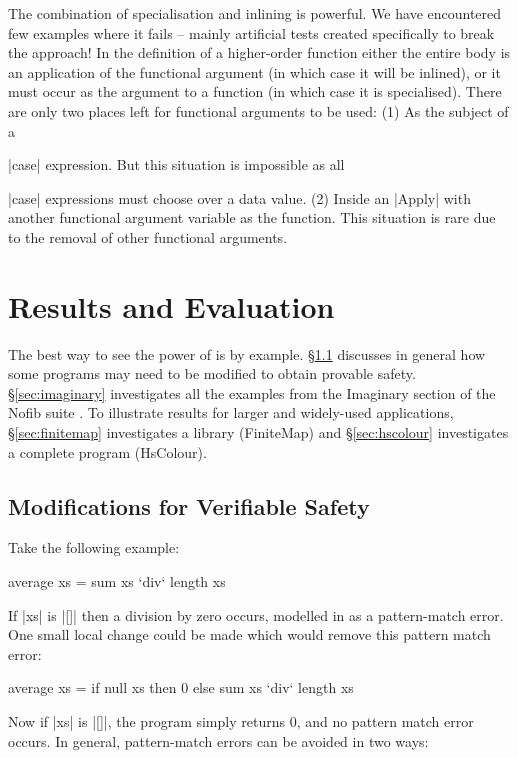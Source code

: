 The combination of specialisation and inlining is powerful. We have encountered few examples where it fails -- mainly artificial tests created specifically to break the approach! In the definition of a higher-order function either the entire body is an application of the functional argument (in which case it will be inlined), or it must occur as the argument to a function (in which case it is specialised). There are only two places left for functional arguments to be used: (1) As the subject of a \ignore|case| expression. But this situation is impossible as all \ignore|case| expressions must choose over a data value. (2) Inside an |Apply| with another functional argument variable as the function. This situation is rare due to the removal of other functional arguments.

\section{Results and Evaluation}
\label{sec:results}

The best way to see the power of \catch{} is by example. \S\ref{sec:safety} discusses in general how some programs may need to be modified to obtain provable safety. \S\ref{sec:imaginary} investigates all the examples from the Imaginary section of the Nofib suite \cite{nofib}. To illustrate results for larger and widely-used applications, \S\ref{sec:finitemap} investigates a library (FiniteMap) and \S\ref{sec:hscolour} investigates a complete program (HsColour).


\subsection{Modifications for Verifiable Safety}
\label{sec:safety}

Take the following example:

\begin{code}
average xs = sum xs `div` length xs
\end{code}

If |xs| is |[]| then a division by zero occurs, modelled in \catch{} as a pattern-match error. One small local change could be made which would remove this pattern match error:

\begin{code}
average xs = if null xs then 0 else sum xs `div` length xs
\end{code}

\noindent Now if |xs| is |[]|, the program simply returns 0, and no pattern match error occurs. In general, pattern-match errors can be avoided in two ways:

